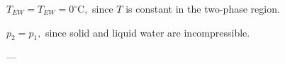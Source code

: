 \( T_{EW} = T_{EW} = 0^\circ \text{C}, \) since \( T \) is constant in the two-phase region.  

\( p_2 = p_1, \) since solid and liquid water are incompressible.  

---